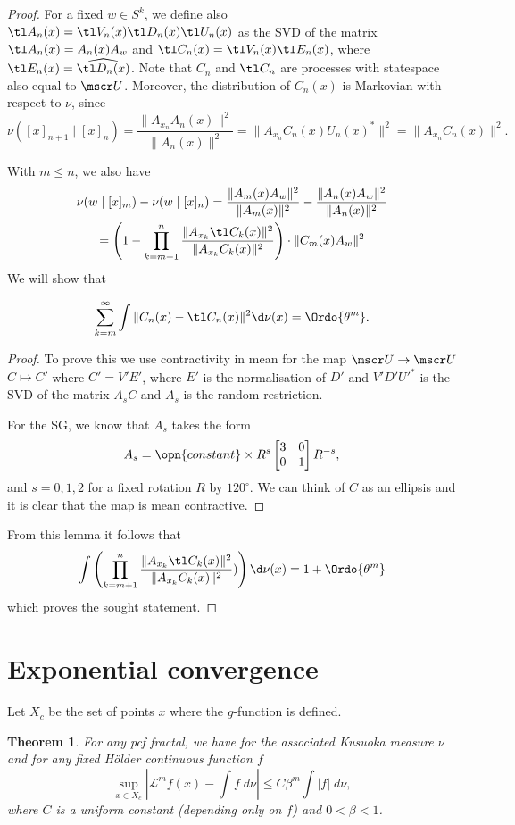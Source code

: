 \documentclass[11pt]{scrartcl}
\theoremstyle{plain} %
\newtheorem{thm}{Theorem}%
\theoremstyle{definition}
\begin{document}
\begin{proof}
For a fixed $w\in S^k$, we define also
 $\tl A_n(x) = \tl V_n(x) \tl D_n(x) \tl U_n(x)$ as the SVD
of the matrix $\tl A_n(x)= A_n(x) A_w$ and $\tl C_n(x)=\tl V_n(x) \tl
E_n(x)$, where $\tl E_n(x) = \widehat{\tl D_n(x)}$. 
Note that $C_n$ and $\tl C_n$ are processes
with statespace also equal to $\mscr U$. Moreover, the distribution of
$C_n(x)$ is Markovian with respect to $\nu$, since 
$$ 
\nu([x]_{n+1}\mid [x]_n) = 
\frac{\| A_{x_n} A_n(x) \|^2}{\| A_n(x) \|^2} 
= \| A_{x_n} C_n(x) U_n(x)^* \|^2
= \| A_{x_n} C_n(x) \|^2.
$$

With $m\leq n$, we also have 
\begin{multline*}
 \nu(w\mid [x]_m) - \nu(w\mid [x]_n) = 
 \frac{\| A_m(x) A_w \|^2}{\| A_m(x) \|^2} - \frac{\| A_n(x) A_w
   \|^2}{\| A_n(x) \|^2} \\
 =
 \left(1 - \prod_{k=m+1}^n \frac{\| A_{x_k} \tl C_k(x) \|^2}{\| A_{x_k} C_k(x) \|^2}\right)
 \cdot \| C_m(x) A_w \|^2
\end{multline*}
We will show that 
\begin{lemma}
$$ \sum_{k=m}^\infty \int \|C_n(x)-\tl C_n(x)\|^2 \d\nu(x) = \Ordo{\theta^m}. $$ 
\end{lemma}
\begin{proof}
  To prove this we use contractivity in mean for the map $\mscr
  U\to\mscr U$ $C \mapsto C'$ where $C'=V'E'$, where $E'$ is the
  normalisation of $D'$ and $V'D'{U'}^*$ is the SVD of the matrix $A_s
  C$ and $A_s$ is the random restriction.
  
  For the SG, we know that $A_s$ takes the form 
  $$ A_s = \opn{constant}\times R^s \begin{bmatrix} 3&0\\ 0&1 \end{bmatrix} R^{-s}, $$
  and $s=0,1,2$ for a fixed rotation $R$ by $120^\circ$. We can think
  of $C$ as an ellipsis and it is clear that the map is mean contractive. 
\end{proof}
From this lemma it follows that
$$
 \int \left(\prod_{k=m+1}^n \frac{\| A_{x_k} \tl C_k(x) \|^2}{\| A_{x_k} C_k(x)
   \|^2})\right)\d\nu(x) = 1+\Ordo{\theta^m}
$$
which proves the sought statement. 

\end{proof}

\section{Exponential convergence}
Let $X_c$ be the set of points $x$ where the $g$-function is defined.
\begin{thm}
For any pcf fractal, we have for the associated Kusuoka measure $\nu$ and for any fixed H\"older continuous function $f$
$$\sup_{x\in X_c} |{\mathcal L}^m f(x)-\int f\; d\nu|\leq C\beta^m\int |f|\; d\nu,$$
where $C$ is a uniform constant (depending only on $f$) and $0<\beta<1$.
\end{thm}
\end{document}
